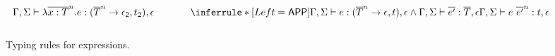 \begin{figure}[H]
\[\begin{array}{@{}c@{}}
                              {\typerule \Gamma \Sigma {\abs x T n e}  {(\funt T n {\kw{\epsilon_2}} t_2)} {\epsilon}}\ \ \ \ \ \ \ \ \ \ \ 
                                                            \inferrule*[Left=\kw{APP}]{\typerule \Gamma \Sigma {e} {(\funt T n {\kw{\epsilon}} t)} {\epsilon} \wedge \typerule {\Gamma} {\Sigma} {\overline{e'}} {\overline{T}} {\epsilon}}
                              {\typerule \Gamma \Sigma {\app {e} {e'} n} {t} {\epsilon}}\\[2ex]
  \end{array}
 \]
 \caption{Typing rules for expressions.}\label{fig:exp-typesystem}
\end{figure}




 